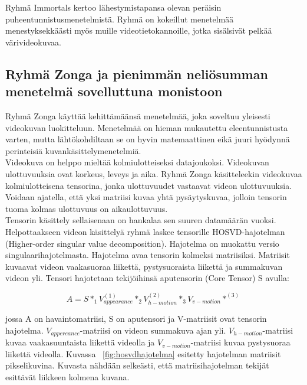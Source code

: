 Ryhmä Immortals kertoo lähestymistapansa olevan peräisin puheentunnistusmenetelmistä. Ryhmä on kokeillut menetelmää menestyksekkäästi 
myös muille videotietokannoille, jotka sisälsivät pelkää värivideokuvaa. \citep{firstround}\\


\subsection{Ryhmä Zonga ja pienimmän neliösumman menetelmä sovelluttuna monistoon}
Ryhmä Zonga käyttää kehittämäänsä menetelmää, joka soveltuu yleisesti videokuvan luokitteluun. 
Menetelmää on hieman mukautettu eleentunnistusta varten, mutta lähtökohdiltaan se on hyvin 
matemaattinen eikä juuri hyödynnä perinteisiä kuvankäsittelymenetelmiä. \citep {6239180}\\

Videokuva on helppo mieltää kolmiulotteiseksi datajoukoksi. Videokuvan ulottuvuuksia ovat korkeus, leveys ja aika.
Ryhmä Zonga käsitteleekin videokuvaa kolmiulotteisena tensorina, jonka ulottuvuudet vastaavat videon ulottuvuuksia.
Voidaan ajatella, että yksi matriisi kuvaa yhtä pysäytyskuvaa, jolloin tensorin tuoma kolmas ulottuvuus on aikaulottuvuus. \citep {6239180}\\

Tensorin käsittely sellaisenaan on hankalaa sen suuren datamäärän vuoksi. Helpottaakseen videon käsittelyä
ryhmä laskee tensorille HOSVD-hajotelman (Higher-order singular value decomposition). Hajotelma on muokattu versio
singulaarihajotelmasta. Hajotelma avaa tensorin kolmeksi matriisiksi.
Matriisit kuvaavat videon vaakasuoraa liikettä, pystysuoraista liikettä ja summakuvan videon yli. \citep {HOSVD} 
Tensori hajotetaan tekijöihinsä aputensorin (Core Tensor) S avulla:

\begin{equation}
A = S *_{1} V_{appearance}^{(1)} *_{2} V_{h-motion}^{(2)} *_{3} V_{v-motion}*^{(3)}
\end{equation}

jossa A on havaintomatriisi, S on aputensori ja V-matriisit ovat tensorin hajotelma. $V_{appereance}$-matriisi on
videon summakuva ajan yli. $V_{h-motion}$-matriisi kuvaa vaakasuuntaista liikettä videolla ja $V_{v-motion}$-matriisi
kuvaa pystysuoraa liikettä videolla. Kuvassa ~\ref{fig:hosvdhajotelma} esitetty hajotelman matriisit pikselikuvina.
Kuvasta nähdään selkeästi, että matriisihajotelman tekijät esittävät liikkeen kolmena kuvana. \citep {6239180}\\


